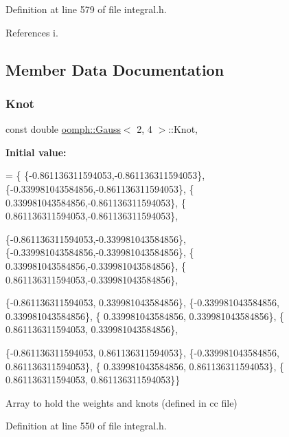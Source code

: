 Definition at line 579 of file integral.\+h.



References i.



\subsection{Member Data Documentation}
\mbox{\label{classoomph_1_1Gauss_3_012_00_014_01_4_a3e973f16910cefc76667d47fd2d8e255}} 
\subsubsection{\texorpdfstring{Knot}{Knot}}
{\footnotesize\ttfamily const double \hyperlink{classoomph_1_1Gauss}{oomph\+::\+Gauss}$<$ 2, 4 $>$\+::Knot\hspace{0.3cm}{\ttfamily [static]}, {\ttfamily [private]}}

{\bfseries Initial value\+:}
\begin{DoxyCode}
= \{
 \{-0.861136311594053,-0.861136311594053\},
 \{-0.339981043584856,-0.861136311594053\},
 \{ 0.339981043584856,-0.861136311594053\},
 \{ 0.861136311594053,-0.861136311594053\},

 \{-0.861136311594053,-0.339981043584856\},
 \{-0.339981043584856,-0.339981043584856\},
 \{ 0.339981043584856,-0.339981043584856\},
 \{ 0.861136311594053,-0.339981043584856\},

 \{-0.861136311594053, 0.339981043584856\},
 \{-0.339981043584856, 0.339981043584856\},
 \{ 0.339981043584856, 0.339981043584856\},
 \{ 0.861136311594053, 0.339981043584856\},

 \{-0.861136311594053, 0.861136311594053\},
 \{-0.339981043584856, 0.861136311594053\},
 \{ 0.339981043584856, 0.861136311594053\},
 \{ 0.861136311594053, 0.861136311594053\}\}
\end{DoxyCode}


Array to hold the weights and knots (defined in cc file) 



Definition at line 550 of file integral.\+h.

\mbox{\label{classoomph_1_1Gauss_3_012_00_014_01_4_adbd25826c5d6062f49392d692584b56b}} 

